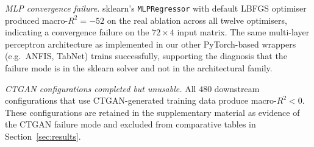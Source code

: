 \textit{MLP convergence failure.} sklearn's \texttt{MLPRegressor} with default LBFGS optimiser produced macro-$R^{2} = -52$ on the real ablation across all twelve optimisers, indicating a convergence failure on the $72 \times 4$ input matrix. The same multi-layer perceptron architecture as implemented in our other PyTorch-based wrappers (e.g.\ ANFIS, TabNet) trains successfully, supporting the diagnosis that the failure mode is in the sklearn solver and not in the architectural family.

\textit{CTGAN configurations completed but unusable.} All $480$ downstream configurations that use CTGAN-generated training data produce macro-$R^{2} < 0$. These configurations are retained in the supplementary material as evidence of the CTGAN failure mode and excluded from comparative tables in Section~\ref{sec:results}.
